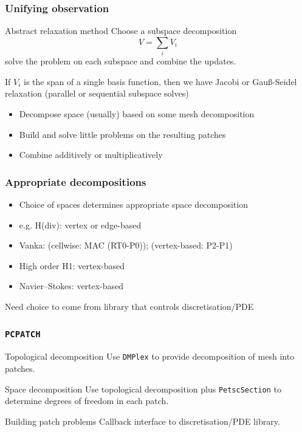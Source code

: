 \documentclass[presentation,aspectratio=43,10pt]{beamer}
\begin{document}
\begin{frame}
  \frametitle{Unifying observation}

  \begin{block}{Abstract relaxation method}
    Choose a subspace decomposition
    \begin{equation*}
      V = \sum_i V_i
    \end{equation*}
    solve the problem on each subspace and combine the updates.
  \end{block}
  \begin{example}
    If $V_i$ is the span of a single basis function, then we have
    Jacobi or Gau\ss-Seidel relaxation (parallel or sequential
    subspace solves)
  \end{example}
  \begin{itemize}
  \item Decompose space (usually) based on some mesh decomposition
  \item Build and solve little problems on the resulting patches
  \item Combine additively or multiplicatively
  \end{itemize}
\end{frame}

\begin{frame}
  \frametitle{Appropriate decompositions}
  \begin{itemize}
  \item Choice of spaces determines appropriate space decomposition
  \item e.g. H(div): vertex or edge-based
  \item Vanka: (cellwise: MAC (RT0-P0)); (vertex-based: P2-P1)
  \item High order H1: vertex-based
  \item Navier--Stokes: vertex-based
  \end{itemize}
  \begin{corollary}
    Need choice to come from library that controls discretisation/PDE
  \end{corollary}
\end{frame}

\begin{frame}
  \frametitle{\texttt{PCPATCH}}
  \begin{block}{Topological decomposition}
    Use \texttt{DMPlex} to provide decomposition of mesh into patches.
  \end{block}

  \begin{block}{Space decomposition}
    Use topological decomposition plus \texttt{PetscSection} to
    determine degrees of freedom in each patch.
  \end{block}

  \begin{block}{Building patch problems}
    Callback interface to discretisation/PDE library.
  \end{block}
\end{frame}
\end{document}
